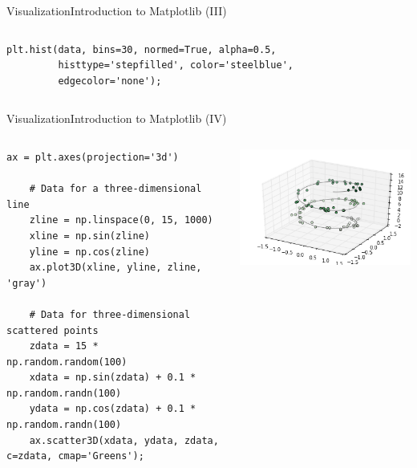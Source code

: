 \documentclass[10pt,compress]{beamer} %
\begin{document}
\begin{frame}[fragile]{Visualization}{Introduction to Matplotlib (III)}
\begin{columns}
\begin{exampleblock}{}
\begin{lstlisting}[basicstyle=\tiny]
	plt.hist(data, bins=30, normed=True, alpha=0.5,
         histtype='stepfilled', color='steelblue',
         edgecolor='none');
	\end{lstlisting}
	\vspace{-0.2cm} 
	\end{exampleblock}
	\end{columns}
\end{frame}

\begin{frame}[fragile]{Visualization}{Introduction to Matplotlib (IV)}
	\begin{columns}
	\begin{exampleblock}{}
	\vspace{-0.2cm} 
	\begin{lstlisting}[basicstyle=\tiny]
	ax = plt.axes(projection='3d')

	# Data for a three-dimensional line
	zline = np.linspace(0, 15, 1000)
	xline = np.sin(zline)
	yline = np.cos(zline)
	ax.plot3D(xline, yline, zline, 'gray')

	# Data for three-dimensional scattered points
	zdata = 15 * np.random.random(100)
	xdata = np.sin(zdata) + 0.1 * np.random.randn(100)
	ydata = np.cos(zdata) + 0.1 * np.random.randn(100)
	ax.scatter3D(xdata, ydata, zdata, c=zdata, cmap='Greens');
	\end{lstlisting}
	\vspace{-0.2cm} 
	\end{exampleblock}

	\centering \includegraphics[width=\textwidth]{figs/matplotlib-3d.png}\\
	\end{columns}
\end{frame}
\end{document}
